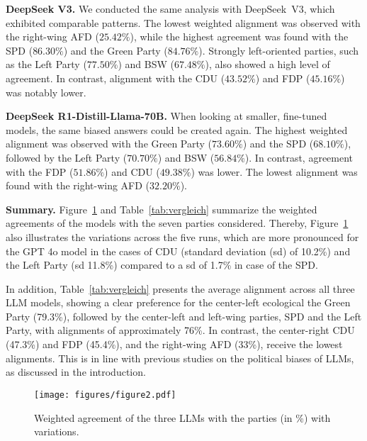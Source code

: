 \documentclass[
	fontsize=10pt,          %
	numbers=noenddot,    	%
    parskip=half,        	%
    listof=totoc,        	%
    bibliography=totoc,  	%
	headsepline=true,       %
	footsepline=false, 		%
    DIV=12                	%
]{scrartcl}
\begin{document}
\textbf{DeepSeek V3.}  We conducted the same analysis with DeepSeek~V3, which exhibited comparable patterns. The lowest weighted alignment was observed with the right-wing AFD ($25.42\%$), while the highest agreement was found with the SPD ($86.30\%$) and the Green Party ($84.76\%$). Strongly left-oriented parties, such as the Left Party ($77.50\%$) and BSW ($67.48\%$), also showed a high level of agreement. In contrast, alignment with the CDU ($43.52\%$) and FDP ($45.16\%$) was notably lower. 

\textbf{DeepSeek R1-Distill-Llama-70B.} When looking at smaller, fine-tuned models, the same biased answers could be created again. 
The highest weighted alignment was observed with the Green Party ($73.60\%$) and the SPD ($68.10\%$), followed by the Left Party ($70.70\%$) and BSW ($56.84\%$). In contrast, agreement with the FDP ($51.86\%$) and CDU ($49.38\%$) was lower. The lowest alignment was found with the right-wing AFD ($32.20\%$).

\textbf{Summary.}  Figure~\ref{fig:comparison} and Table~\ref{tab:vergleich} summarize the weighted agreements of the models with the seven parties considered. 
Thereby, Figure~\ref{fig:comparison} also illustrates the variations across the five runs, which are more pronounced for the GPT 4o model in the cases of CDU (standard deviation (sd) of 10.2\%) and the Left Party (sd 11.8\%) compared to a sd of 1.7\% in case of the SPD. 


In addition, Table~\ref{tab:vergleich} presents the average alignment across all three LLM models, showing a clear preference for the center-left ecological the Green Party (79.3\%), followed by the center-left and left-wing parties, SPD and the Left Party, with alignments of approximately 76\%. In contrast, the center-right CDU (47.3\%) and FDP (45.4\%), and the right-wing AFD (33\%), receive the lowest alignments. This is in line with previous studies on the political biases of LLMs, as discussed in the introduction.


\begin{figure}[h]
    \centering
    \texttt{[image: figures/figure2.pdf]}
    \caption{Weighted agreement of the three LLMs with the parties (in \%) with variations.}
    \label{fig:comparison}
\end{figure}
\end{document}
